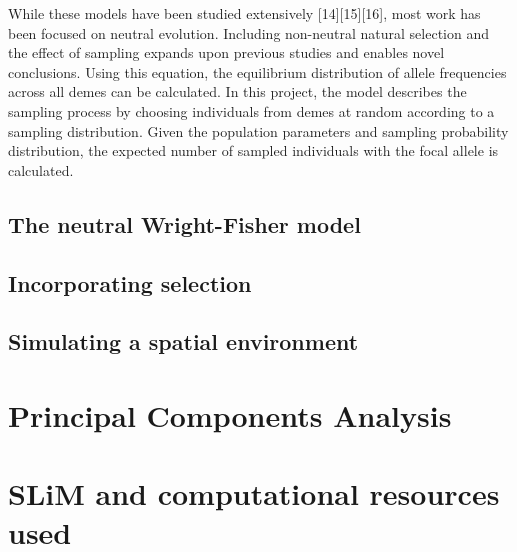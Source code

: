 While these models have been studied extensively [14][15][16], most work has been focused on neutral evolution. Including non-neutral natural selection and the effect of sampling expands upon previous studies and enables novel conclusions.
Using this equation, the equilibrium distribution of allele frequencies across all demes can be calculated. In this project, the model describes the sampling process by choosing individuals from demes at random according to a sampling distribution. Given the population parameters and sampling probability distribution, the expected number of sampled individuals with the focal allele is calculated.




\subsection{The neutral Wright-Fisher model}

\subsection{Incorporating selection}

\subsection{Simulating a spatial environment}

\section{Principal Components Analysis}

\section{SLiM and computational resources used}
